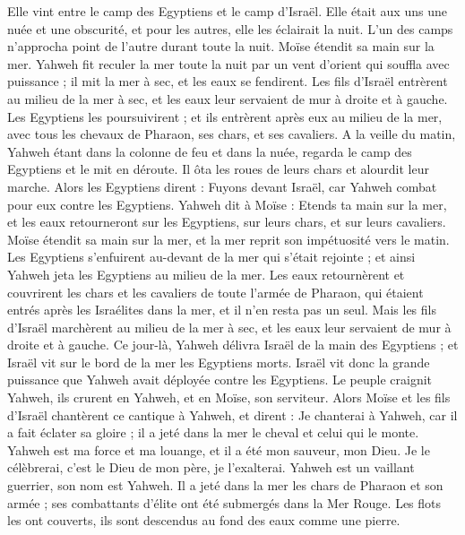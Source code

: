\begin{multicols}{2}
Elle vint entre le camp des Egyptiens et le camp d'Israël. Elle était aux uns une nuée et une obscurité, et pour les autres, elle les éclairait la nuit. L'un des camps n'approcha point de l'autre durant toute la nuit.
Moïse étendit sa main sur la mer. Yahweh fit reculer la mer toute la nuit par un vent d'orient qui souffla avec puissance ; il mit la mer à sec, et les eaux se fendirent.
Les fils d'Israël entrèrent au milieu de la mer à sec, et les eaux leur servaient de mur à droite et à gauche.
Les Egyptiens les poursuivirent ; et ils entrèrent après eux au milieu de la mer, avec tous les chevaux de Pharaon, ses chars, et ses cavaliers.
A la veille du matin, Yahweh étant dans la colonne de feu et dans la nuée, regarda le camp des Egyptiens et le mit en déroute.
Il ôta les roues de leurs chars et alourdit leur marche. Alors les Egyptiens dirent : Fuyons devant Israël, car Yahweh combat pour eux contre les Egyptiens.
Yahweh dit à Moïse : Etends ta main sur la mer, et les eaux retourneront sur les Egyptiens, sur leurs chars, et sur leurs cavaliers.
Moïse étendit sa main sur la mer, et la mer reprit son impétuosité vers le matin. Les Egyptiens s'enfuirent au-devant de la mer qui s'était rejointe ; et ainsi Yahweh jeta les Egyptiens au milieu de la mer.
Les eaux retournèrent et couvrirent les chars et les cavaliers de toute l'armée de Pharaon, qui étaient entrés après les Israélites dans la mer, et il n'en resta pas un seul.
Mais les fils d'Israël marchèrent au milieu de la mer à sec, et les eaux leur servaient de mur à droite et à gauche.
Ce jour-là, Yahweh délivra Israël de la main des Egyptiens ; et Israël vit sur le bord de la mer les Egyptiens morts.
Israël vit donc la grande puissance que Yahweh avait déployée contre les Egyptiens. Le peuple craignit Yahweh, ils crurent en Yahweh, et en Moïse, son serviteur.
\VerseOne{}Alors Moïse et les fils d'Israël chantèrent ce cantique à Yahweh, et dirent : Je chanterai à Yahweh, car il a fait éclater sa gloire ; il a jeté dans la mer le cheval et celui qui le monte.
Yahweh est ma force et ma louange, et il a été mon sauveur, mon Dieu. Je le célèbrerai, c'est le Dieu de mon père, je l'exalterai.
Yahweh est un vaillant guerrier, son nom est Yahweh.
Il a jeté dans la mer les chars de Pharaon et son armée ; ses combattants d’élite ont été submergés dans la Mer Rouge.
Les flots les ont couverts, ils sont descendus au fond des eaux comme une pierre.

\end{multicols}

